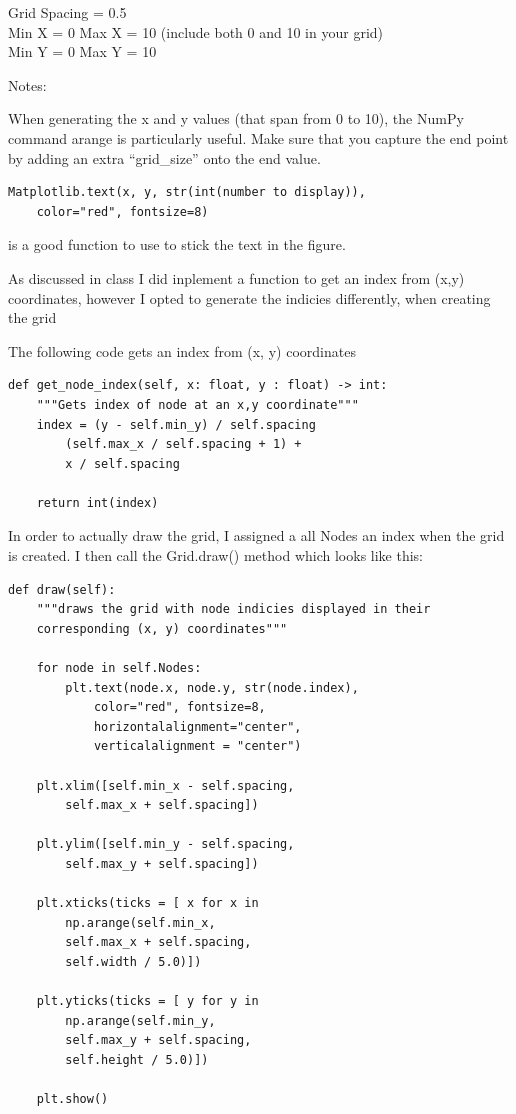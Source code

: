 \documentclass{article}
\begin{document}
\bigskip
\noindent Grid Spacing = 0.5 \\
Min X = 0  Max X = 10 (include both 0 and 10 in your grid) \\
Min Y = 0  Max Y = 10

\bigskip
\noindent Notes:

\bigskip
\noindent When generating the x and y values (that span from 0 to 10), the NumPy command arange is 
particularly useful. Make sure that you capture the end point by adding an extra “grid\_size” onto the 
end value. 

\bigskip
\begin{mdframed}[backgroundcolor=bg]
\begin{verbatim}
Matplotlib.text(x, y, str(int(number to display)),
    color="red", fontsize=8)
\end{verbatim}
\end{mdframed}
\bigskip
\noindent is a good function to use to stick the text in the figure.

\bigskip
As discussed in class I did inplement a function to get an index from (x,y) coordinates,
however I opted to generate the indicies differently, when creating the grid

\bigskip
\noindent The following code gets an index from (x, y) coordinates
\begin{mdframed}[backgroundcolor=bg]
\begin{verbatim}
def get_node_index(self, x: float, y : float) -> int:
    """Gets index of node at an x,y coordinate"""    
    index = (y - self.min_y) / self.spacing 
        (self.max_x / self.spacing + 1) +
        x / self.spacing
    
    return int(index)
\end{verbatim}
\end{mdframed}
In order to actually draw the grid, I assigned a all Nodes an index when the grid is created.
I then call the Grid.draw() method which looks like this:
\begin{mdframed}[backgroundcolor=bg]
\begin{verbatim}
def draw(self):
    """draws the grid with node indicies displayed in their 
    corresponding (x, y) coordinates"""

    for node in self.Nodes:
        plt.text(node.x, node.y, str(node.index), 
            color="red", fontsize=8, 
            horizontalalignment="center", 
            verticalalignment = "center")  
    
    plt.xlim([self.min_x - self.spacing, 
        self.max_x + self.spacing])

    plt.ylim([self.min_y - self.spacing,
        self.max_y + self.spacing])
    
    plt.xticks(ticks = [ x for x in 
        np.arange(self.min_x, 
        self.max_x + self.spacing,
        self.width / 5.0)])
        
    plt.yticks(ticks = [ y for y in 
        np.arange(self.min_y,
        self.max_y + self.spacing,
        self.height / 5.0)])

    plt.show()
\end{verbatim}
\end{mdframed}
\end{document}
